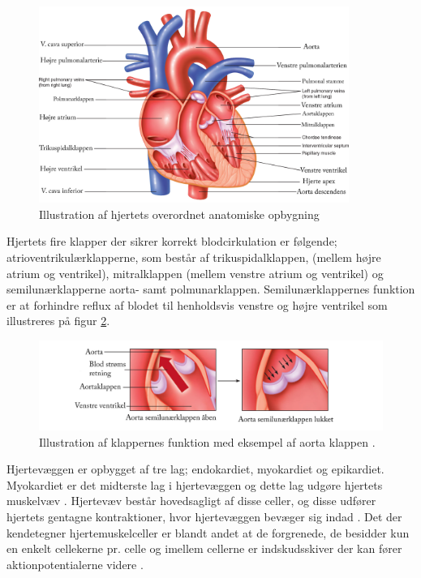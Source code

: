 \begin{figure}[H] %
\begin{center}
\includegraphics[width=0.9\textwidth]{figures/hjertet_overordnet.png}
\end{center}
\caption{Illustration af hjertets overordnet anatomiske opbygning \cite{Guyton2006}}
\label{fig:hjerte_overordnet}
\end{figure}

\noindent Hjertets fire klapper der sikrer korrekt blodcirkulation er følgende; atrioventrikulærklapperne, som består af trikuspidalklappen, (mellem højre atrium og ventrikel), mitralklappen (mellem venstre atrium og ventrikel) og semilunærklapperne aorta- samt polmunarklappen. Semilunærklappernes funktion er at forhindre reflux af blodet til henholdsvis venstre og højre ventrikel som illustreres på figur \ref{fig:hjerte_klap}.  \cite{gronanatomi}  


\begin{figure}[H] %
\begin{center}
\includegraphics[width=1\textwidth]{figures/cusp.png}
\end{center}
\caption{Illustration af klappernes funktion med eksempel af aorta klappen \cite{cindy}.}
\label{fig:hjerte_klap}
\end{figure}

\noindent Hjertevæggen er opbygget af tre lag; endokardiet, myokardiet og epikardiet. Myokardiet er det midterste lag i hjertevæggen og dette lag udgøre hjertets muskelvæv \cite{gronanatomi}. Hjertevæv består hovedsagligt af disse celler, og disse udfører hjertets gentagne kontraktioner, hvor hjertevæggen bevæger sig indad \cite{cindy}. 
Det der kendetegner hjertemuskelceller er blandt andet at de forgrenede, de besidder kun en enkelt cellekerne pr. celle og imellem cellerne er indskudsskiver der kan fører aktionpotentialerne videre \cite{martini}.



